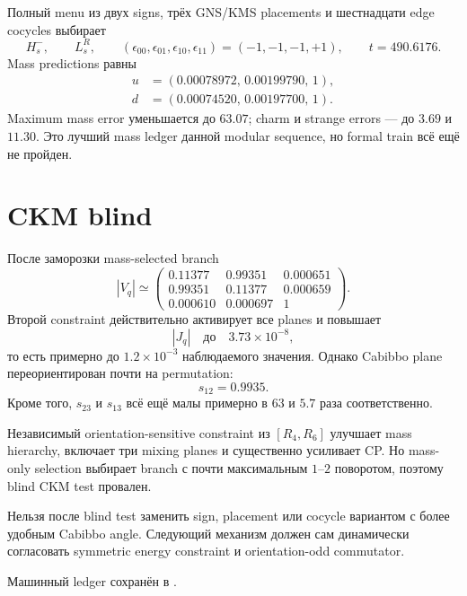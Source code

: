 Полный menu из двух signs, трёх GNS/KMS placements и шестнадцати edge
cocycles выбирает
\begin{equation}
 H_s^-,\qquad L_s^{R},\qquad
 (\epsilon_{00},\epsilon_{01},\epsilon_{10},\epsilon_{11})=(-1,-1,-1,+1),
 \qquad t=490.6176.
\end{equation}
Mass predictions равны
\begin{align}
 u&=(0.00078972,\,0.00199790,\,1),\\
 d&=(0.00074520,\,0.00197700,\,1).
\end{align}
Maximum mass error уменьшается до \(63.07\); charm и strange errors --- до
\(3.69\) и \(11.30\). Это лучший mass ledger данной modular sequence, но
formal train всё ещё не пройден.

\section{CKM blind}

После заморозки mass-selected branch
\begin{equation}
 |V_q|\simeq
 \begin{pmatrix}
 0.11377&0.99351&0.000651\\
 0.99351&0.11377&0.000659\\
 0.000610&0.000697&1
 \end{pmatrix}.
\end{equation}
Второй constraint действительно активирует все planes и повышает
\begin{equation}
 |J_q|\quad\text{до}\quad3.73\times10^{-8},
\end{equation}
то есть примерно до \(1.2\times10^{-3}\) наблюдаемого значения. Однако
Cabibbo plane переориентирован почти на permutation:
\begin{equation}
 s_{12}=0.9935.
\end{equation}
Кроме того, \(s_{23}\) и \(s_{13}\) всё ещё малы примерно в \(63\) и \(5.7\)
раза соответственно.

\begin{theorem}
Независимый orientation-sensitive constraint из \([R_4,R_6]\) улучшает
mass hierarchy, включает три mixing planes и существенно усиливает CP.
Но mass-only selection выбирает branch с почти максимальным \(1\)--\(2\)
поворотом, поэтому blind CKM test провален.
\end{theorem}

\begin{nogocriterion}
Нельзя после blind test заменить sign, placement или cocycle вариантом с
более удобным Cabibbo angle. Следующий механизм должен сам динамически
согласовать symmetric energy constraint и orientation-odd commutator.
\end{nogocriterion}

Машинный ledger сохранён в
.